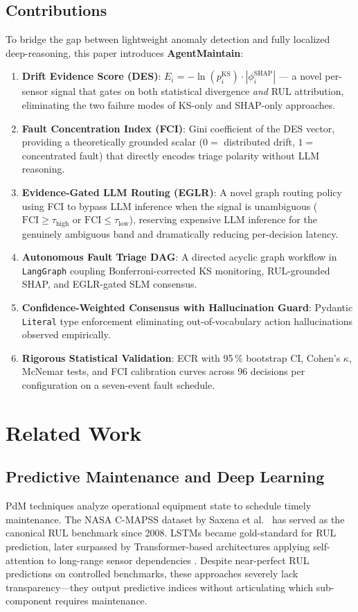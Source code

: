 \documentclass[conference, 10pt]{IEEEtran}
\begin{document}
\subsection{Contributions}
To bridge the gap between lightweight anomaly detection and fully localized deep-reasoning, this paper introduces \textbf{AgentMaintain}:

\begin{enumerate}
    \item \textbf{Drift Evidence Score (DES)}: $E_i = -\ln(p_i^{\text{KS}}) \cdot |\phi_i^{\text{SHAP}}|$ — a novel per-sensor signal that gates on both statistical divergence \emph{and} RUL attribution, eliminating the two failure modes of KS-only and SHAP-only approaches.
    \item \textbf{Fault Concentration Index (FCI)}: Gini coefficient of the DES vector, providing a theoretically grounded scalar ($0 =$ distributed drift, $1 =$ concentrated fault) that directly encodes triage polarity without LLM reasoning.
    \item \textbf{Evidence-Gated LLM Routing (EGLR)}: A novel graph routing policy using FCI to bypass LLM inference when the signal is unambiguous ($\text{FCI} \geq \tau_{\text{high}}$ or $\text{FCI} \leq \tau_{\text{low}}$), reserving expensive LLM inference for the genuinely ambiguous band and dramatically reducing per-decision latency.
    \item \textbf{Autonomous Fault Triage DAG}: A directed acyclic graph workflow in \texttt{LangGraph} coupling Bonferroni-corrected KS monitoring, RUL-grounded SHAP, and EGLR-gated SLM consensus.
    \item \textbf{Confidence-Weighted Consensus with Hallucination Guard}: Pydantic \texttt{Literal} type enforcement eliminating out-of-vocabulary action hallucinations observed empirically.
    \item \textbf{Rigorous Statistical Validation}: ECR with 95\,\% bootstrap CI, Cohen's $\kappa$, McNemar tests, and FCI calibration curves across 96 decisions per configuration on a seven-event fault schedule.
\end{enumerate}

\section{Related Work}

\subsection{Predictive Maintenance and Deep Learning}
PdM techniques analyze operational equipment state to schedule timely maintenance. The NASA C-MAPSS dataset by Saxena et al.\ \cite{cmapss} has served as the canonical RUL benchmark since 2008. LSTMs became gold-standard for RUL prediction, later surpassed by Transformer-based architectures applying self-attention to long-range sensor dependencies \cite{transformer_pdm}. Despite near-perfect RUL predictions on controlled benchmarks, these approaches severely lack transparency---they output predictive indices without articulating which sub-component requires maintenance.
\end{document}
